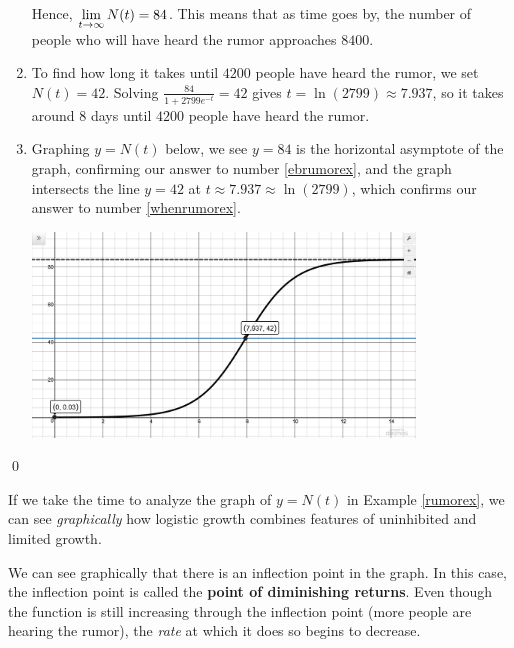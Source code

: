\documentclass{ximera}
\begin{document}
\begin{example}
\begin{enumerate}
Hence, $\ds{\lim_{t \rightarrow \infty} N(t) = 84}$.     This means that as time goes by, the number of people who will have heard the rumor approaches $8400$. 

\item  To find how long it takes until $4200$ people have heard the rumor, we set $N(t) = 42$.  Solving $\frac{84}{1+2799e^{-t}} = 42$ gives $t =  \ln(2799) \approx 7.937$, so   it takes around $8$ days until $4200$ people have heard the rumor.

\item  Graphing $y=N(t)$ below, we see $y=84$ is the horizontal asymptote of the graph, confirming our answer to number  \ref{ebrumorex}, and the graph intersects the line $y=42$ at $t \approx 7.937 \approx \ln(2799) $, which confirms our answer to number \ref{whenrumorex}.

\begin{center}

\includegraphics[width=4in]{./ApplicationsofExponentialandLogarithmicFunctionsGraphics/ExpLogAppEx01.jpg} 


\end{center}

\end{enumerate}

\qed

\end{example}

If we take the time to analyze the graph of $y=N(t)$ in Example \ref{rumorex}, we can see \textit{graphically} how logistic growth combines  features of uninhibited and limited growth.  

\smallskip

We can see graphically that there is an inflection point in the graph. In this case, the inflection point is called the \textbf{point of diminishing returns}.    Even though the function is still increasing through the inflection point (more people are hearing the rumor), the \textit{rate} at which it does so begins to decrease. 
\end{document}
